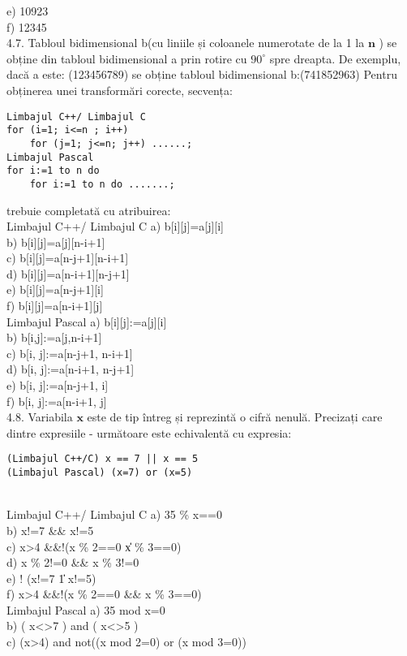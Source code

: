 e) 10923
\\
f) 12345
\\
4.7. Tabloul bidimensional b(cu liniile și coloanele numerotate de la 1 la $\mathbf{n}$ ) se obține din tabloul bidimensional a prin rotire cu $90^{\circ}$ spre dreapta.
De exemplu, dacă a este: (123456789) se obține tabloul bidimensional b:(741852963)
Pentru obținerea unei transformări corecte, secvența:
\begin{verbatim}
Limbajul C++/ Limbajul C
for (i=1; i<=n ; i++)
    for (j=1; j<=n; j++) ......;
Limbajul Pascal
for i:=1 to n do
    for i:=1 to n do .......;
\end{verbatim}
trebuie completată cu atribuirea:
\\
Limbajul C++/ Limbajul C
a) b[i][j]=a[j][i]
\\
b) b[i][j]=a[j][n-i+1]
\\
c) b[i][j]=a[n-j+1][n-i+1]
\\
d) b[i][j]=a[n-i+1][n-j+1]
\\
e) b[i][j]=a[n-j+1][i]
\\
f) b[i][j]=a[n-i+1][j]
\\
Limbajul Pascal
a) b[i][j]:=a[j][i]
\\
b) b[i,j]:=a[j,n-i+1]
\\
c) b[i, j]:=a[n-j+1, n-i+1]
\\
d) b[i, j]:=a[n-i+1, n-j+1]
\\
e) b[i, j]:=a[n-j+1, i]
\\
f) b[i, j]:=a[n-i+1, j]
\\
4.8. Variabila $\mathbf{x}$ este de tip întreg și reprezintă o cifră nenulă. Precizați care dintre expresiile - următoare este echivalentă cu expresia:
\begin{verbatim}
(Limbajul C++/C) x == 7 || x == 5
(Limbajul Pascal) (x=7) or (x=5)
\end{verbatim}    
\\
Limbajul C++/ Limbajul C
a) 35 \% x==0
\\
b) x!=7 \&\& x!=5
\\
c) x>4 \&\&!(x \% 2==0 \|\| x \% 3==0)
\\
d) x \% 2!=0 \&\& x \% 3!=0
\\
e) ! (x!=7 \|\| 1 x!=5)
\\
f) x>4 \&\&!(x \% 2==0 \&\& x \% 3==0)
\\
Limbajul Pascal
a) 35 mod x=0
\\
b) ( x<>7 ) and ( x<>5 )
\\
c) (x>4) and not((x mod 2=0) or (x mod 3=0))
\\
